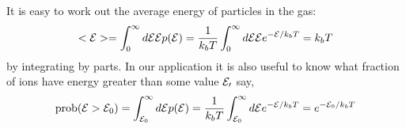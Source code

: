 \documentclass[12pt]{article}
\begin{document}
It is easy to work out the average energy of particles in the gas:
\begin{equation}
<{\cal E}>=\int_0^\infty {d{\cal E}{\cal E}p({\cal E})}=\frac{1}{k_bT}\int_0^\infty {d{\cal E}{\cal E}e^{-{\cal E}/k_bT}}=k_bT
\end{equation}
by integrating by parts. In our application it is also useful to know what fraction of ions have energy greater than some value ${\cal E_0}$ say,
\begin{equation}
\mbox{prob}({\cal E}>{\cal E}_0)=\int_{{\cal E}_0}^\infty{d{\cal E} p({\cal E})}=\frac{1}{k_bT}\int_{{\cal E}_0}^\infty{d{\cal E} e^{-{\cal E}/k_bT}}=e^{-{\cal E}_0/k_bT}
\end{equation}
\end{document}
